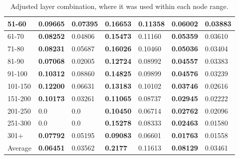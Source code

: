 \begin{table*}[]
\begin{tabular}{|l|l|l||l|l||l|l|}
        51-60     & \textbf{0.09665}                        & 0.07395                        & \textbf{0.16653}                 & 0.11358          & \textbf{0.06002} & 0.03883          \\ \hline
        61-70     & \textbf{0.08252}                        & 0.04806                        & \textbf{0.15473}                 & 0.11160          & \textbf{0.05359} & 0.03610          \\ \hline
        71-80     & \textbf{0.08231}                        & 0.05687                        & \textbf{0.16026}                 & 0.10460          & \textbf{0.05036} & 0.03404          \\ \hline
        81-90     & \textbf{0.07068}                        & 0.02005                        & \textbf{0.12724}                 & 0.08992          & \textbf{0.04557} & 0.03383          \\ \hline
        91-100    & \textbf{0.10312}                        & 0.08860                        & \textbf{0.14825}                 & 0.09899          & \textbf{0.04576} & 0.03239          \\ \hline
        101-150   & \textbf{0.12200}                        & 0.06631                        & \textbf{0.13183}                 & 0.10102          & \textbf{0.03746} & 0.02616          \\ \hline
        151-200   & \textbf{0.10173}                        & 0.03261                        & \textbf{0.11065}                 & 0.08737          & \textbf{0.02945} & 0.02222          \\ \hline
        201-250   & 0.0                                     & 0.0                            & \textbf{0.10450}                 & 0.06714          & \textbf{0.02762} & 0.02096          \\ \hline
        251-300   & 0.0                                     & 0.0                            & \textbf{0.15278}                 & 0.08333          & \textbf{0.02463} & 0.01580          \\ \hline
        301+      & \textbf{0.07792}                        & 0.05195                        & \textbf{0.09083}                 & 0.06601          & \textbf{0.01763} & 0.01558          \\ \hline
        Average   & \textbf{0.06451}                        & 0.03562                        & \textbf{0.2177 }                 & 0.11613          & \textbf{0.08129} & 0.03461          \\ \hline
    \end{tabular}
    \caption{Adjusted layer combination, where it was used within each node range.}
    \label{tab:recall-adjusted-layer-bad-performance}
\end{table*}

